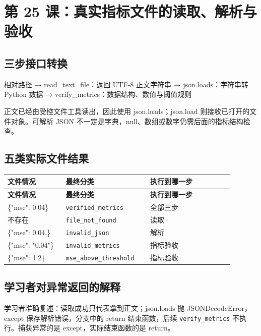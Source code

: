 \documentclass[UTF8,zihao=-4,fontset=fandol]{ctexart}
\begin{document}
\section{第 25 课：真实指标文件的读取、解析与验收}

\subsection{三步接口转换}

\begin{Code}
相对路径
  → read_text_file：返回 UTF-8 正文字符串
  → json.loads：字符串转 Python 数据
  → verify_metrics：数据结构、数值与阈值规则
\end{Code}

正文已经由受控文件工具读出，因此使用 json.loads；json.load 则接收已打开的文件对象。可解析 JSON 不一定是字典，null、数组或数字仍需后面的指标结构检查。

\subsection{五类实际文件结果}

{\small\setlength{\tabcolsep}{4pt}
\renewcommand{\arraystretch}{1.25}
\begin{longtable}{>{\raggedright\arraybackslash}p{0.23\linewidth}>{\raggedright\arraybackslash}p{0.33\linewidth}>{\raggedright\arraybackslash}p{0.33\linewidth}}
\toprule
\textbf{文件情况} & \textbf{最终分类} & \textbf{执行到哪一步} \\
\midrule\endfirsthead
\toprule
\textbf{文件情况} & \textbf{最终分类} & \textbf{执行到哪一步} \\
\midrule\endhead
\bottomrule\endfoot
\{"mse": 0.04\} & \nolinkurl{verified_metrics} & 全部三步 \\
不存在 & \nolinkurl{file_not_found} & 读取 \\
\{"mse": 0.04,\} & \nolinkurl{invalid_json} & 解析 \\
\{"mse": "0.04"\} & \nolinkurl{invalid_metrics} & 指标验收 \\
\{"mse": 1.2\} & \nolinkurl{mse_above_threshold} & 指标验收 \\
\end{longtable}}

\subsection{学习者对异常返回的解释}

学习者准确复述：读取成功只代表拿到正文；json.loads 抛 JSONDecodeError，except 保存解析错误，分支中的 return 结束函数，后续 \nolinkurl{verify_metrics} 不执行。捕获异常的是 except，实际结束函数的是 return。
\end{document}
